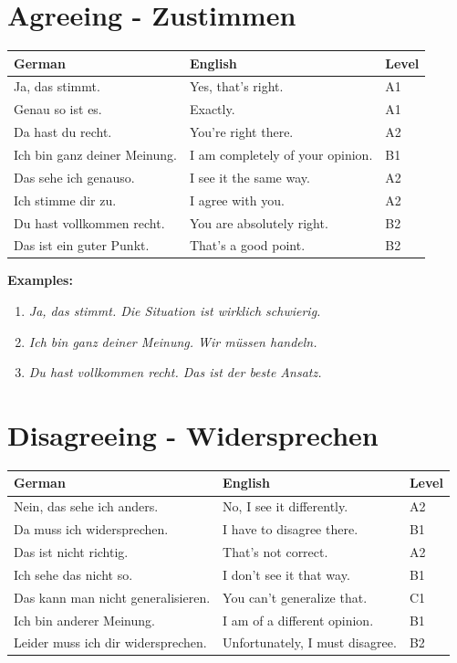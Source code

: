 \section{Agreeing - Zustimmen}
\label{sec:Zustimmen}

\begin{center}
\begin{tabular}{|l|p{7cm}|p{5cm}|}
\hline
German & English & Level \\ \hline
Ja, das stimmt. & Yes, that's right. & A1 \\ \hline
Genau so ist es. & Exactly. & A1 \\ \hline
Da hast du recht. & You're right there. & A2 \\ \hline
Ich bin ganz deiner Meinung. & I am completely of your opinion. & B1 \\ \hline
Das sehe ich genauso. & I see it the same way. & A2 \\ \hline
Ich stimme dir zu. & I agree with you. & A2 \\ \hline
Du hast vollkommen recht. & You are absolutely right. & B2 \\ \hline
Das ist ein guter Punkt. & That's a good point. & B2 \\ \hline
\end{tabular}
\end{center}

\bigskip
\noindent\textbf{Examples:}

\begin{enumerate}
    \item \textit{Ja, das stimmt. Die Situation ist wirklich schwierig.}
    \item \textit{Ich bin ganz deiner Meinung. Wir müssen handeln.}
    \item \textit{Du hast vollkommen recht. Das ist der beste Ansatz.}
\end{enumerate}

\section{Disagreeing - Widersprechen}
\label{sec:Widersprechen}

\begin{center}
\begin{tabular}{|l|p{7cm}|p{5cm}|}
\hline
German & English & Level \\ \hline
Nein, das sehe ich anders. & No, I see it differently. & A2 \\ \hline
Da muss ich widersprechen. & I have to disagree there. & B1 \\ \hline
Das ist nicht richtig. & That's not correct. & A2 \\ \hline
Ich sehe das nicht so. & I don't see it that way. & B1 \\ \hline
Das kann man nicht generalisieren. & You can't generalize that. & C1 \\ \hline
Ich bin anderer Meinung. & I am of a different opinion. & B1 \\ \hline
Leider muss ich dir widersprechen. & Unfortunately, I must disagree. & B2 \\ \hline
\end{tabular}
\end{center}

